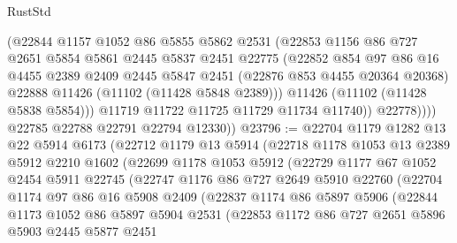 \begin{lexlean}{RustStd}
\begin{coremodule}
                  (@22844
                    @1157
                    @1052
                    @86
                    @5855
                    @5862
                    @2531
                    (@22853
                      @1156
                      @86
                      @727
                      @2651
                      @5854
                      @5861
                      @2445
                      @5837
                      @2451
                      @22775
                      (@22852
                        @854
                        @97
                        @86
                        @16
                        @4455
                        @2389
                        @2409
                        @2445
                        @5847
                        @2451
                        (@22876 @853 @4455 @20364 @20368)
                        @22888
                        @11426
                        (@11102 (@11428 @5848 @2389)))
                      @11426
                      (@11102 (@11428 @5838 @5854)))
                    @11719
                    @11722
                    @11725
                    @11729
                    @11734
                    @11740))
                @22778))))
        @22785
        @22788
        @22791
        @22794
        @12330))
@23796 := @22704
    @1179
    @1282
    @13
    @22
    @5914
    @6173
    (@22712
      @1179
      @13
      @5914
      (@22718
        @1178
        @1053
        @13
        @2389
        @5912
        @2210
        @1602
        (@22699
          @1178
          @1053
          @5912
          (@22729
            @1177
            @67
            @1052
            @2454
            @5911
            @22745
            (@22747
              @1176
              @86
              @727
              @2649
              @5910
              @22760
              (@22704
                @1174
                @97
                @86
                @16
                @5908
                @2409
                (@22837
                  @1174
                  @86
                  @5897
                  @5906
                  (@22844
                    @1173
                    @1052
                    @86
                    @5897
                    @5904
                    @2531
                    (@22853
                      @1172
                      @86
                      @727
                      @2651
                      @5896
                      @5903
                      @2445
                      @5877
                      @2451

\end{coremodule}
\end{lexlean}

